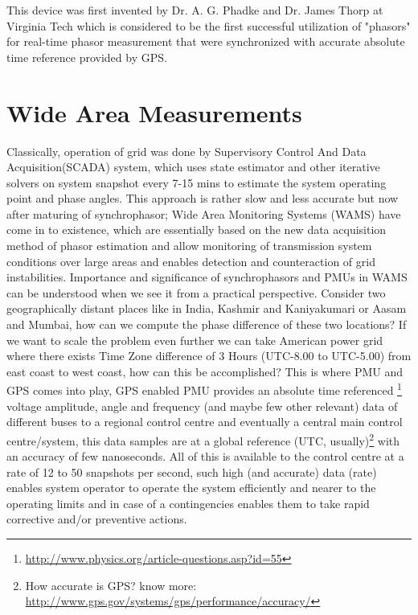 This device was first invented by Dr. A. G. Phadke and Dr. James Thorp at Virginia Tech which is considered to be the first successful utilization of "phasors" for real-time phasor measurement that were synchronized with accurate absolute time reference provided by GPS.

\section{Wide Area Measurements}

Classically, operation of grid was done by Supervisory Control And Data Acquisition(SCADA) system, which uses state estimator and other iterative solvers on system snapshot every 7-15 mins to estimate the system operating point and phase angles. This approach is rather slow and less accurate but now after maturing of synchrophasor; Wide Area Monitoring Systems (WAMS) have come in to existence, which are essentially based on the new data acquisition method of phasor estimation and allow monitoring of transmission system conditions over large areas and enables detection and counteraction of grid instabilities. Importance and significance of synchrophasors and PMUs in WAMS can be understood when we see it from a practical perspective. Consider two geographically distant places like in India, Kashmir and Kaniyakumari or Aasam and Mumbai, how can we compute the phase difference of these two locations? If we want to scale the problem even further we can take American power grid where there exists Time Zone difference of 3 Hours (UTC-8.00 to UTC-5.00) from east coast to west coast, how can this be accomplished? This is where PMU and GPS comes into play, GPS enabled PMU provides an absolute time referenced \footnote{\url{http://www.physics.org/article-questions.asp?id=55}} voltage amplitude, angle and frequency (and maybe few other relevant) data of different buses to a regional control centre and eventually a central main control centre/system, this data samples are at a global reference (UTC, usually)\footnote{How accurate is GPS? know more: \url{http://www.gps.gov/systems/gps/performance/accuracy/}} with an accuracy of few nanoseconds. All of this is available to the control centre at a rate of 12 to 50 snapshots per second, such high (and accurate) data (rate) enables system operator to operate the system efficiently and nearer to the operating limits and in case of a contingencies enables them to take rapid corrective and/or preventive actions.
